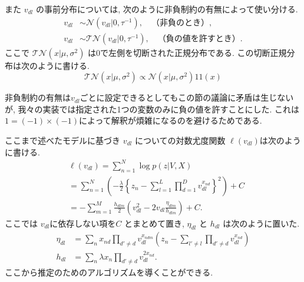 \documentclass[a4paper,12ptc]{jsarticle} %
\newcommand{\normal}{\mathcal{N}}
\newcommand{\truncnorm}{\mathcal{TN}}
\newcommand{\C}{C}
\newcommand{\one}{1\!\!1}
\begin{document}
また $v_{dl}$ の事前分布については, 次のように非負制約の有無によって使い分ける.
\begin{align}
v_{dl} & \sim \normal(v_{dl} | 0,\tau^{-1}), \quad  \mbox{（非負のとき）} \label{eq_prior1}, \\
v_{dl} & \sim \truncnorm(v_{dl} | 0, \tau^{-1}), \quad  \mbox{（負の値を許すとき）.} \label{eq_prior2}
\end{align}
ここで $\truncnorm(x | \mu, \sigma^2)$ は0で左側を切断された正規分布である.
この切断正規分布は次のように書ける.
\begin{equation*}
   \truncnorm(x | \mu, \sigma^2) \propto    \normal(x | \mu, \sigma^2) \one(x) 
\end{equation*}

非負制約の有無は$v_{dl}$ごとに設定できるとしてもこの節の議論に矛盾は生じないが, 我々の実装では指定された1つの変数のみに負の値を許すことにした. これは$1=(-1)\times(-1)$によって解釈が煩雑になるのを避けるためである.

ここまで述べたモデルに基づき $v_{dl}$ についての対数尤度関数 $\ell(v_{dl})$は次のように書ける.
\begin{align*}
& \ell(v_{dl}) =\sum_{n=1}^{N} \log p(z|V, X)\\
&= \sum_{n=1}^{N}\left(-\frac{\lambda}{2}\left\{ z_n -\sum_{l=1}^L\prod_{d=1}^D v_{dl}^{x_{nd}} \right\}^2\right)+ \C\\
&= -\sum_{m=1}^M\frac{h_{dlm}}{2}\left(v_{dl}^2-2v_{dl}\frac{\eta_{dlm}}{h_{dlm}}\right) +C.
\end{align*}
ここでは $v_{dl}$に依存しない項を$C$ とまとめて置き, $\eta_{dl}$ と $h_{dl}$ は次のように置いた.
\begin{align}
\eta_{dl} &= \sum_n x_{nd} \prod_{d' \neq d} v_{dl}^{x_{ndm}}\left( z_{n} - \sum_{l'\neq l} \prod_{d' \neq d} v_{dl}^{x_{nd}} \right) \label{eq_eta}\\
h_{dl} &= \sum_n \lambda x_{n} \prod_{d' \neq d} v_{dl}^{2x_{nd}}. \label{eq_h}
\end{align}
ここから推定のためのアルゴリズムを導くことができる.
\end{document}
